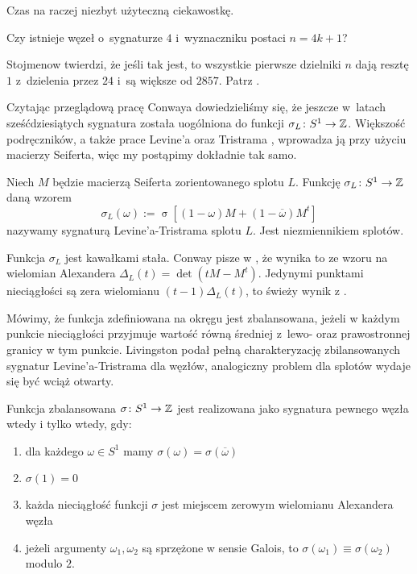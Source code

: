 Czas na raczej niezbyt użyteczną ciekawostkę.

\begin{conjecture}
    Czy istnieje węzeł o~sygnaturze $4$ i~wyznaczniku postaci $n = 4k + 1$?
\end{conjecture}

Stojmenow twierdzi, że jeśli tak jest, to wszystkie pierwsze dzielniki $n$ dają resztę $1$ z~dzielenia przez $24$ i~są większe od $2857$.
Patrz \cite[s. 540]{ohtsuki02}.

Czytając przeglądową pracę Conwaya \cite{conway19} dowiedzieliśmy się, że jeszcze w~latach sześćdziesiątych sygnatura została uogólniona do funkcji $\sigma_L \colon S^1 \to \mathbb Z$.
%
Większość podręczników, a także prace Levine'a \cite{levine69} oraz Tristrama \cite{tristram69}, wprowadza ją przy użyciu macierzy Seiferta, więc my postąpimy dokładnie tak samo.
%
%

\begin{definition}
%
    Niech $M$ będzie macierzą Seiferta zorientowanego splotu $L$.
    Funkcję $\sigma_L \colon S^1 \to \mathbb Z$ daną wzorem
    \begin{equation}
        \sigma_L(\omega) := \operatorname{\sigma} [(1-\omega) M + (1 - \overline{\omega})M^t]
    \end{equation}
    nazywamy sygnaturą Levine'a-Tristrama splotu $L$.
    Jest niezmiennikiem splotów.
\end{definition}

Funkcja $\sigma_L$ jest kawałkami stała.
Conway pisze w \cite{conway19}, że wynika to ze wzoru na wielomian Alexandera $\Delta_L(t) = \det(tM - M^t)$.
%
Jedynymi punktami nieciągłości są zera wielomianu $(t-1)\Delta_L(t)$, to świeży wynik z \cite{gilmer16}.

Mówimy, że funkcja zdefiniowana na okręgu jest zbalansowana, jeżeli w każdym punkcie nieciągłości przyjmuje wartość równą średniej z~lewo- oraz prawostronnej granicy w tym punkcie.
Livingston podał pełną charakteryzację zbilansowanych sygnatur Levine'a-Tristrama dla węzłów, analogiczny problem dla splotów wydaje się być wciąż otwarty.

\begin{proposition}
\label{balanced_iff_four_conditions}%
    Funkcja zbalansowana $\sigma \colon S^1 \to \mathbb Z$ jest realizowana jako sygnatura pewnego węzła wtedy i tylko wtedy, gdy:
    \begin{enumerate}
        \item dla każdego $\omega \in S^1$ mamy $\sigma(\omega) = \sigma(\overline{\omega})$
        \item $\sigma(1) = 0$
        \item każda nieciągłość funkcji $\sigma$ jest miejscem zerowym wielomianu Alexandera węzła
        \item jeżeli argumenty $\omega_1, \omega_2$ są sprzężone w sensie Galois, to $\sigma(\omega_1) \equiv \sigma(\omega_2)$ modulo $2$.
    \end{enumerate}
\end{proposition}


